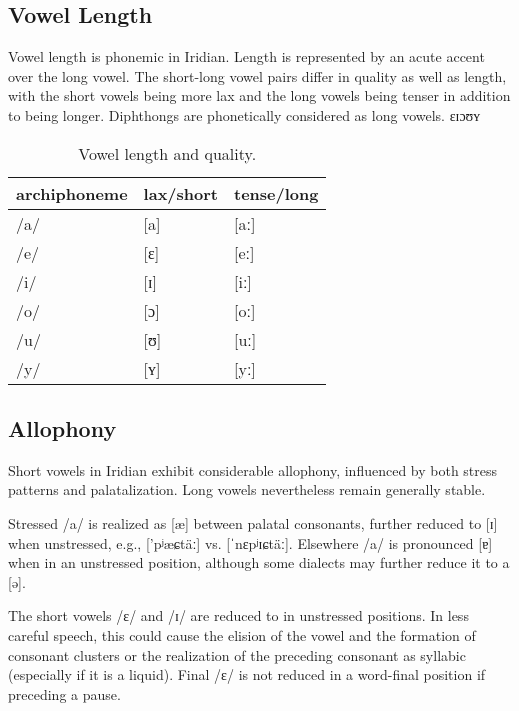 \subsection{Vowel Length}

Vowel length is phonemic in Iridian. Length is represented by an acute accent over the long vowel. The short-long vowel pairs differ in quality as well as length, with the short vowels being more lax and the long vowels being tenser in addition to being longer. Diphthongs are phonetically considered as long vowels.
ɛɪɔʊʏ
\begin{table}[h!]
	\small
	\caption{Vowel length and quality.}
	\medskip
	\begin{tabu} to 0.7\textwidth{MMM}
		\toprule
		{\sc archiphoneme} & {\sc lax/short} &{\sc tense/long}\\ \midrule

		/a/	& [a]	& [aː]		\\
		/e/	& [ɛ]	& [eː]		\\
		/i/	& [ɪ]	& [iː]		\\
		/o/	& [ɔ]	& [oː]		\\
		/u/	& [ʊ] & [uː]		\\
		/y/	& [ʏ]	& [yː]		\\
		\bottomrule
	\end{tabu}
\end{table}

\subsection{Allophony}

Short vowels in Iridian exhibit considerable allophony, influenced by both stress patterns and palatalization. Long vowels nevertheless remain generally stable.

Stressed /a/ is realized as [\ae] between palatal consonants, further reduced to [ɪ] when unstressed, e.g.,  ['pʲæɕtäː] vs.  [ˈnɛpʲɪɕtäː]. Elsewhere /a/ is pronounced [ɐ] when in an unstressed position, although some dialects may further reduce it to a [ə].

The short vowels /ɛ/ and /ɪ/ are reduced to  in unstressed positions. In less careful speech, this could cause the elision of the vowel and the formation of consonant clusters or the realization of the preceding consonant as syllabic (especially if it is a liquid). Final /ɛ/ is not reduced in a word-final position if preceding a pause.


